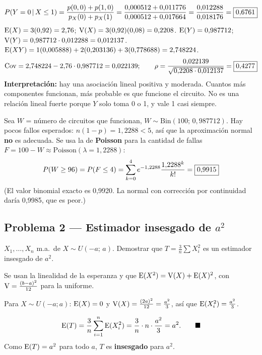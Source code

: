 \[
P(Y=0\,|\,X\le1)=\frac{p(0,0)+p(1,0)}{p_X(0)+p_X(1)}=\frac{0{,}000512+0{,}011776}{0{,}000512+0{,}017664}=\frac{0{,}012288}{0{,}018176}=\boxed{0{,}6761}
\]
$\mathrm{E}(X)=3(0{,}92)=2{,}76$; $\mathrm{V}(X)=3(0{,}92)(0{,}08)=0{,}2208$.
$\mathrm{E}(Y)=0{,}987712$; $\mathrm{V}(Y)=0{,}987712\cdot0{,}012288=0{,}012137$.
$\mathrm{E}(XY)=1(0{,}005888)+2(0{,}203136)+3(0{,}778688)=2{,}748224$.
\[
\mathrm{Cov}=2{,}748224-2{,}76\cdot0{,}987712=0{,}022139;\qquad
\rho=\frac{0{,}022139}{\sqrt{0{,}2208\cdot0{,}012137}}=\boxed{0{,}4277}
\]
\textbf{Interpretación:} hay una asociación lineal positiva y moderada. Cuantos más componentes funcionan, más probable es que funcione el circuito. No es una relación lineal fuerte porque $Y$ solo toma 0 o 1, y vale 1 casi siempre.

Sea $W$ = número de circuitos que funcionan, $W\sim\mathrm{Bin}(100;\,0{,}987712)$. Hay pocos fallos esperados: $n(1-p)=1{,}2288<5$, así que la aproximación normal \textbf{no} es adecuada. Se usa la de \textbf{Poisson} para la cantidad de fallas $F=100-W\approx\mathrm{Poisson}(\lambda=1{,}2288)$:
\[
P(W\ge96)=P(F\le4)=\sum_{k=0}^{4}e^{-1{,}2288}\frac{1{,}2288^k}{k!}=\boxed{0{,}9915}
\]
(El valor binomial exacto es 0,9920. La normal con corrección por continuidad daría 0,9985, que es peor.)

\subsection{Problema 2 --- Estimador insesgado de $a^2$}
\begin{enun}
$X_1,\dots,X_n$ m.a.\ de $X\sim U(-a;\,a)$. Demostrar que $T=\frac3n\sum X_i^2$ es un estimador insesgado de $a^2$.
\end{enun}
\begin{metodo}
Se usan la linealidad de la esperanza y que $\mathrm{E}(X^2)=\mathrm{V}(X)+\mathrm{E}(X)^2$, con $\mathrm{V}=\frac{(b-a)^2}{12}$ para la uniforme.
\end{metodo}
 Para $X\sim U(-a;a)$: $\mathrm{E}(X)=0$ y $\mathrm{V}(X)=\frac{(2a)^2}{12}=\frac{a^2}{3}$, así que $\mathrm{E}(X_i^2)=\frac{a^2}{3}$.

\[
\mathrm{E}(T)=\frac3n\sum_{i=1}^n\mathrm{E}(X_i^2)=\frac3n\cdot n\cdot\frac{a^2}{3}=a^2.\qquad\blacksquare
\]
Como $\mathrm{E}(T)=a^2$ para todo $a$, $T$ es \textbf{insesgado} para $a^2$.

